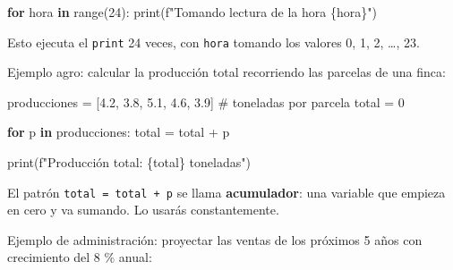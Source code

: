 \documentclass[
  spanish,
  letterpaper,
  DIV=11,
  numbers=noendperiod]{scrreprt}
\newenvironment{Shaded}{\begin{snugshade}}{\end{snugshade}}
\newcommand{\BuiltInTok}[1]{\textcolor[rgb]{0.00,0.23,0.31}{#1}}
\newcommand{\CommentTok}[1]{\textcolor[rgb]{0.37,0.37,0.37}{#1}}
\newcommand{\ControlFlowTok}[1]{\textcolor[rgb]{0.00,0.23,0.31}{\textbf{#1}}}
\newcommand{\DecValTok}[1]{\textcolor[rgb]{0.68,0.00,0.00}{#1}}
\newcommand{\FloatTok}[1]{\textcolor[rgb]{0.68,0.00,0.00}{#1}}
\newcommand{\KeywordTok}[1]{\textcolor[rgb]{0.00,0.23,0.31}{\textbf{#1}}}
\newcommand{\NormalTok}[1]{\textcolor[rgb]{0.00,0.23,0.31}{#1}}
\newcommand{\OperatorTok}[1]{\textcolor[rgb]{0.37,0.37,0.37}{#1}}
\newcommand{\SpecialCharTok}[1]{\textcolor[rgb]{0.37,0.37,0.37}{#1}}
\newcommand{\SpecialStringTok}[1]{\textcolor[rgb]{0.13,0.47,0.30}{#1}}
\begin{document}
\begin{Shaded}
\begin{Highlighting}[]
\ControlFlowTok{for}\NormalTok{ hora }\KeywordTok{in} \BuiltInTok{range}\NormalTok{(}\DecValTok{24}\NormalTok{):}
    \BuiltInTok{print}\NormalTok{(}\SpecialStringTok{f"Tomando lectura de la hora }\SpecialCharTok{\{}\NormalTok{hora}\SpecialCharTok{\}}\SpecialStringTok{"}\NormalTok{)}
\end{Highlighting}
\end{Shaded}

Esto ejecuta el \texttt{print} 24 veces, con \texttt{hora} tomando los
valores 0, 1, 2, \ldots, 23.

Ejemplo agro: calcular la producción total recorriendo las parcelas de
una finca:

\begin{Shaded}
\begin{Highlighting}[]
\NormalTok{producciones }\OperatorTok{=}\NormalTok{ [}\FloatTok{4.2}\NormalTok{, }\FloatTok{3.8}\NormalTok{, }\FloatTok{5.1}\NormalTok{, }\FloatTok{4.6}\NormalTok{, }\FloatTok{3.9}\NormalTok{]  }\CommentTok{\# toneladas por parcela}
\NormalTok{total }\OperatorTok{=} \DecValTok{0}

\ControlFlowTok{for}\NormalTok{ p }\KeywordTok{in}\NormalTok{ producciones:}
\NormalTok{    total }\OperatorTok{=}\NormalTok{ total }\OperatorTok{+}\NormalTok{ p}

\BuiltInTok{print}\NormalTok{(}\SpecialStringTok{f"Producción total: }\SpecialCharTok{\{}\NormalTok{total}\SpecialCharTok{\}}\SpecialStringTok{ toneladas"}\NormalTok{)}
\end{Highlighting}
\end{Shaded}

El patrón \texttt{total\ =\ total\ +\ p} se llama \textbf{acumulador}:
una variable que empieza en cero y va sumando. Lo usarás constantemente.

Ejemplo de administración: proyectar las ventas de los próximos 5 años
con crecimiento del 8 \% anual:

\begin{Shaded}
\end{Shaded}
\end{document}
